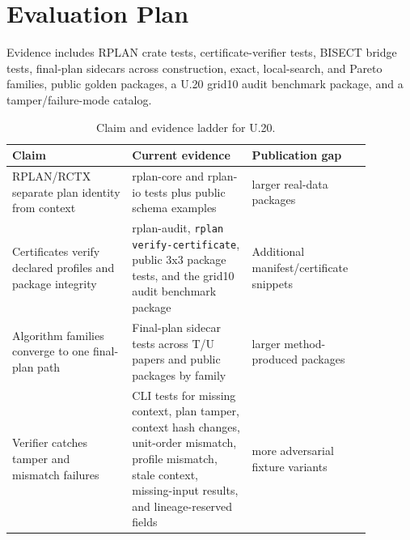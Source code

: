 \section{Evaluation Plan}

Evidence includes RPLAN crate tests, certificate-verifier tests, BISECT bridge
tests, final-plan sidecars across construction, exact, local-search, and Pareto
families, public golden packages, a U.20 grid10 audit benchmark package, and a
tamper/failure-mode catalog.

\begin{table}[htbp]
\centering
\small
\begin{tabular}{p{0.30\linewidth}p{0.30\linewidth}p{0.28\linewidth}}
\toprule
Claim & Current evidence & Publication gap \\
\midrule
RPLAN/RCTX separate plan identity from context & rplan-core and rplan-io tests
plus public schema examples & larger real-data packages \\
Certificates verify declared profiles and package integrity & rplan-audit,
\texttt{rplan verify-certificate}, public 3x3 package tests, and the grid10
audit benchmark package & Additional manifest/certificate snippets \\
Algorithm families converge to one final-plan path & Final-plan sidecar tests
across T/U papers and public packages by family & larger method-produced
packages \\
Verifier catches tamper and mismatch failures & CLI tests for missing context,
plan tamper, context hash changes, unit-order mismatch, profile mismatch, stale
context, missing-input results, and lineage-reserved fields & more adversarial
fixture variants \\
\bottomrule
\end{tabular}
\caption{Claim and evidence ladder for U.20.}
\end{table}

